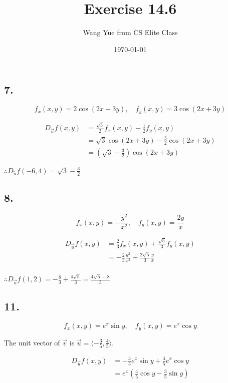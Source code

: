 \documentclass{article}
\begin{document}
  \title{Exercise 14.6}
  \author{Wang Yue from CS Elite Class}
  \date{\today}
  \maketitle

  \subsection*{7. }

  $$f_x(x, y) = 2\cos (2x + 3y), \quad f_y(x, y) = 3 \cos (2x + 3y)$$

  $$\begin{aligned}
    D_{\overrightarrow{u}} f(x, y) &= \frac{\sqrt{3}}{2} f_x(x, y) - \frac 1 2 f_y(x, y) \\
    &= \sqrt 3 \cos (2x + 3y) - \frac 3 2 \cos (2x + 3y) \\
    &= (\sqrt 3 - \frac 3 2)\cos (2x + 3y)
  \end{aligned}$$

  $\therefore D_{\overleftrightarrow{u}}f(-6, 4) = \sqrt 3 - \frac 3 2$

  \subsection*{8. }

  $$f_x(x, y) = -\frac{y^2}{x^2}, \quad f_y(x, y) = \frac{2y}{x}$$

  $$\begin{aligned}
    D_{\overrightarrow{u}} f(x, y) &= \frac 2 3 f_x(x, y) + \frac{\sqrt 5}{3} f_y(x, y) \\
    &= -\frac 2 3 \frac{y^2}{x^2} + \frac{2\sqrt 5}{3} \frac{y}{x} \\
  \end{aligned}$$

  $\therefore D_{\overrightarrow u}f(1, 2) = -\frac 8 3 + \frac{4\sqrt 5}{3} = \frac{4\sqrt 5 - 8}{3}$

  \subsection*{11. }

  $$f_x(x, y) = e^x \sin y, \quad f_y(x, y) = e^x \cos y$$

  The unit vector of $\overrightarrow v$ is $\overrightarrow u = \langle -\frac 3 5, \frac 4 5 \rangle$.

  $$\begin{aligned}
    D_{\overrightarrow u}f(x, y) &= -\frac 3 5 e^x \sin y + \frac 4 5 e^x \cos y \\
    &= e^x(\frac 4 5 \cos y - \frac 3 5 \sin y)
  \end{aligned}$$
\end{document}
